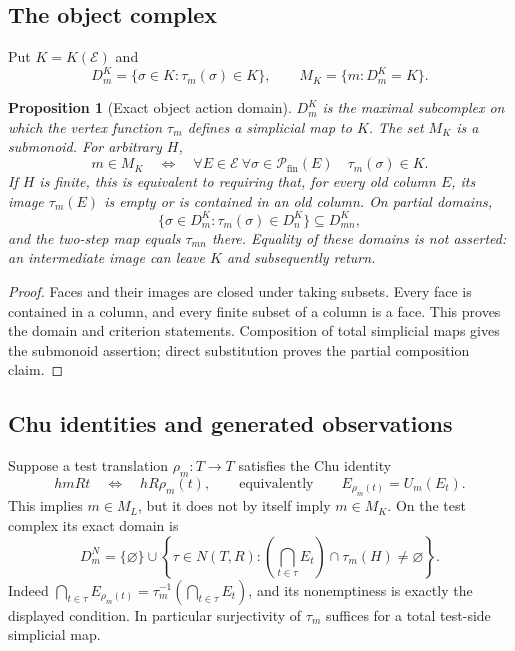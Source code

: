 \documentclass[11pt]{article}
\newtheorem{proposition}[theorem]{Proposition}
\theoremstyle{definition}
\newcommand{\Fin}{\mathcal P_{\mathrm{fin}}}
\begin{document}
\subsection{The object complex}
Put $K=K(\mathcal E)$ and
\[
 D_m^K=\{\sigma\in K:\tau_m(\sigma)\in K\},\qquad
 M_K=\{m:D_m^K=K\}.
\]
\begin{proposition}[Exact object action domain]\label{prop:objectaction}
$D_m^K$ is the maximal subcomplex on which the vertex function $\tau_m$
defines a simplicial map to $K$. The set $M_K$ is a submonoid.
For arbitrary $H$,
\[
 m\in M_K\quad\Longleftrightarrow\quad
 \forall E\in\mathcal E\ \forall\sigma\in\Fin(E)\quad
 \tau_m(\sigma)\in K.
\]
If $H$ is finite, this is equivalent to requiring that, for every old
column $E$, its image $\tau_m(E)$ is empty or is contained in an old
column. On partial domains,
\[
 \{\sigma\in D_m^K:\tau_m(\sigma)\in D_n^K\}
 \subseteq D_{mn}^K,
\]
and the two-step map equals $\tau_{mn}$ there. Equality of these domains
is not asserted: an intermediate image can leave $K$ and subsequently
return.
\end{proposition}
\begin{proof}
Faces and their images are closed under taking subsets. Every face is
contained in a column, and every finite subset of a column is a face.
This proves the domain and criterion statements. Composition of total
simplicial maps gives the submonoid assertion; direct substitution proves
the partial composition claim.
\end{proof}

\subsection{Chu identities and generated observations}
Suppose a test translation $\rho_m:T\to T$ satisfies the Chu identity
\[
 hmRt\quad\Longleftrightarrow\quad hR\rho_m(t),
 \qquad\text{equivalently}\qquad E_{\rho_m(t)}=U_m(E_t).
\tag{Chu}
\]
This implies $m\in M_L$, but it does not by itself imply $m\in M_K$.
On the test complex its exact domain is
\[
 D_m^N=\{\varnothing\}\cup
 \left\{\tau\in N(T,R):
       \left(\bigcap_{t\in\tau}E_t\right)\cap\tau_m(H)\ne\varnothing\right\}.
\]
Indeed $\bigcap_{t\in\tau}E_{\rho_m(t)}
=\tau_m^{-1}(\bigcap_{t\in\tau}E_t)$, and its nonemptiness is exactly
the displayed condition. In particular surjectivity of $\tau_m$ suffices
for a total test-side simplicial map.
\end{document}
